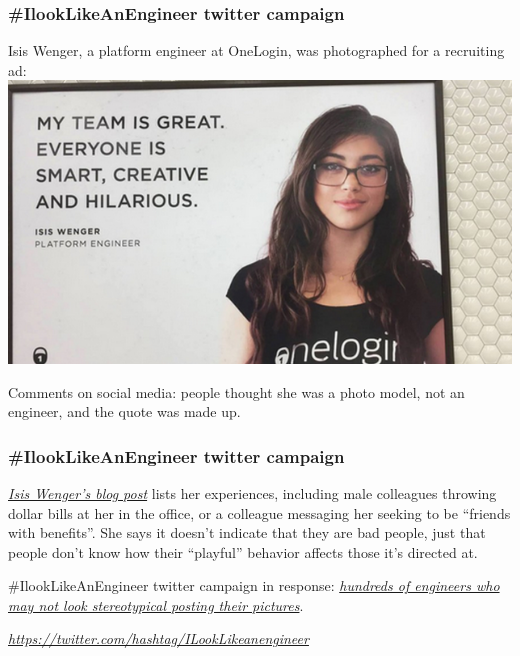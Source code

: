 \documentclass{beamer}
\begin{document}
\begin{frame}
\frametitle{\#IlookLikeAnEngineer twitter campaign}
Isis Wenger, a platform engineer at OneLogin, was photographed for a recruiting ad: 
\includegraphics[scale=0.5]{engineer.png}

Comments on social media: people thought she was a photo model, not an engineer, and the quote was made up. 
\end{frame}

\begin{frame}
\frametitle{\#IlookLikeAnEngineer twitter campaign}
{\it \href{https://medium.com/the-coffeelicious/you-may-have-seen-my-face-on-bart-8b9561003e0f}{Isis Wenger's blog post}} lists her experiences, including male colleagues throwing dollar bills at her in the office, or a colleague messaging her seeking to be ``friends with benefits''. She says it doesn't indicate that they are bad people, just that people don't know how their ``playful'' behavior affects those it's directed at. 

\vspace{0.2in}

\#IlookLikeAnEngineer twitter campaign in response: {\it \href{http://www.bbc.com/news/blogs-trending-33783007}{hundreds of engineers who may not look stereotypical posting their pictures}}.  

\vspace{0.2in}

{\it \href{https://twitter.com/hashtag/ILookLikeanengineer}{https://twitter.com/hashtag/ILookLikeanengineer}}

\end{frame}
\end{document}
